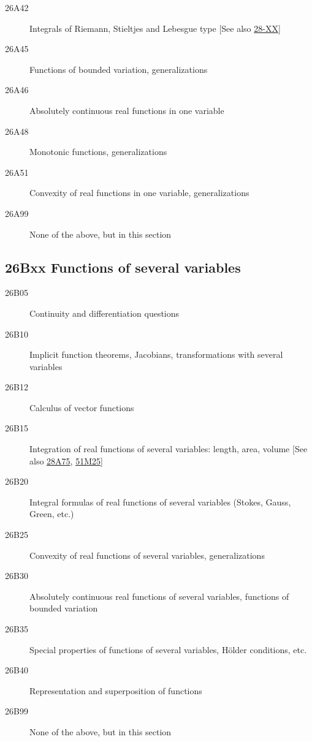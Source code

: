 \begin{description}
\item [26A42]\label{26A42} Integrals of Riemann, Stieltjes and Lebesgue type [See also \hyperref[28-XX]{28-XX}]
\item [26A45]\label{26A45} Functions of bounded variation, generalizations
\item [26A46]\label{26A46} Absolutely continuous real functions in one variable
\item [26A48]\label{26A48} Monotonic functions, generalizations
\item [26A51]\label{26A51} Convexity of real functions in one variable, generalizations
\item [26A99]\label{26A99} None of the above, but in this section
\end{description}
\subsection*{26Bxx  Functions of several variables }\label{26Bxx}
\begin{description} 
\item [26B05]\label{26B05} Continuity and differentiation questions
\item [26B10]\label{26B10} Implicit function theorems, Jacobians, transformations with several variables
\item [26B12]\label{26B12} Calculus of vector functions
\item [26B15]\label{26B15} Integration of real functions of several variables: length, area, volume [See also \hyperref[28A75]{28A75}, \hyperref[51M25]{51M25}]
\item [26B20]\label{26B20} Integral formulas of real functions of several variables (Stokes, Gauss, Green, etc.)
\item [26B25]\label{26B25} Convexity of real functions of several variables, generalizations
\item [26B30]\label{26B30} Absolutely continuous real functions of several variables, functions of bounded variation
\item [26B35]\label{26B35} Special properties of functions of several variables, H\"{o}lder conditions, etc.
\item [26B40]\label{26B40} Representation and superposition of functions
\item [26B99]\label{26B99} None of the above, but in this section
\end{description}
